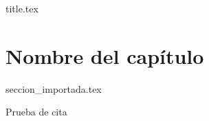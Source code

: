 \documentclass[a4paper,11pt]{book}
\begin{document}

\frontmatter
{title.tex}

\clearpage
\thispagestyle{empty}

\tableofcontents


\mainmatter
\chapter{Nombre del capítulo}
{seccion_importada.tex}

Prueba de cita \cite{einstein}


\backmatter

\clearpage

\printbibliography[heading=bibintoc,title={Bibliografía}]
\end{document}

